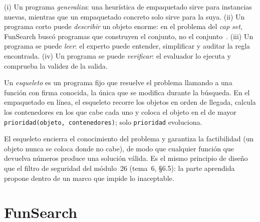 \begin{observacion}\label{obs:por-que-programas}
(i) Un programa \emph{generaliza}: una heurística de empaquetado sirve para instancias nuevas, mientras que un empaquetado concreto solo sirve para la suya. (ii) Un programa corto puede \emph{describir} un objeto enorme: en el problema del \emph{cap set}, FunSearch buscó programas que construyen el conjunto, no el conjunto~\cite{funsearch}. (iii) Un programa se puede \emph{leer}: el experto puede entender, simplificar y auditar la regla encontrada. (iv) Un programa se puede \emph{verificar}: el evaluador lo ejecuta y comprueba la validez de la salida.
\end{observacion}

\begin{definicion}\label{def:esqueleto}
Un \emph{esqueleto} es un programa fijo que resuelve el problema llamando a una función con firma conocida, la única que se modifica durante la búsqueda. En el empaquetado en línea, el esqueleto recorre los objetos en orden de llegada, calcula los contenedores en los que cabe cada uno y coloca el objeto en el de mayor \texttt{prioridad(objeto, contenedores)}; solo \texttt{prioridad} evoluciona.
\end{definicion}

El esqueleto encierra el conocimiento del problema y garantiza la factibilidad (un objeto nunca se coloca donde no cabe), de modo que cualquier función que devuelva números produce una solución válida. Es el mismo principio de diseño que el filtro de seguridad del módulo~26 (tema~6, §6.5): la parte aprendida propone dentro de un marco que impide lo inaceptable.

\section{FunSearch}

\addtocounter{figure}{1}%

